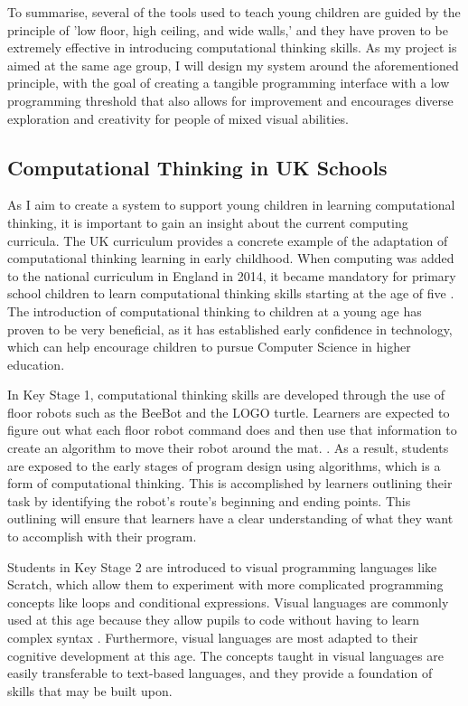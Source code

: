 \documentclass[oneside,%
                    author={Malak Hajji},
                    degree={BSc},
                    title={Designing An Accessible Computational Toolkit For Students},
                  subtitle={With Mixed Visual Abilities}]{dissertation}
\begin{document}
To summarise, several of the tools used to teach young children are guided by the principle of 'low floor, high ceiling, and wide walls,' and they have proven to be extremely effective in introducing computational thinking skills. As my project is aimed at the same age group, I will design my system around the aforementioned principle, with the goal of creating a tangible programming interface with a low programming threshold that also allows for improvement and encourages diverse exploration and creativity for people of mixed visual abilities.

\subsection{Computational Thinking in UK Schools}
As I aim to create a system to support young children in learning computational thinking, it is important to gain an insight about the current computing curricula.
The UK curriculum provides a concrete example of the adaptation of computational thinking learning in early childhood. When computing was added to the national curriculum in England in 2014, it became mandatory for primary school children to learn computational thinking skills starting at the age of five \cite{education-department}.
The introduction of computational thinking to children at a young age has proven to be very beneficial, as it has established early confidence in technology, which can help encourage children to pursue Computer Science in higher education\cite{confidence}.

In Key Stage 1, computational thinking skills are developed through the use of floor robots such as the BeeBot and the LOGO turtle. Learners are expected to figure out what each floor robot command does and then use that information to create an algorithm to move their robot around the mat. \cite{robot-KS1,education-department,curricula}. As a result, students are exposed to the early stages of program design using algorithms, which is a form of computational thinking. This is accomplished by learners outlining their task by identifying the robot's route's beginning and ending points. This outlining will ensure that learners have a clear understanding of what they want to accomplish with their program\cite{curricula}.

Students in Key Stage 2 are introduced to visual programming languages like Scratch\cite{scratch}, which allow them to experiment with more complicated programming concepts like loops and conditional expressions. Visual languages are commonly used at this age because they allow pupils to code without having to learn complex syntax \cite{curricula}. Furthermore, visual languages are most adapted to their cognitive development at this age\cite{cognitive}. The concepts taught in visual languages are easily transferable to text-based languages, and they provide a foundation of skills that may be built upon.
\end{document}
